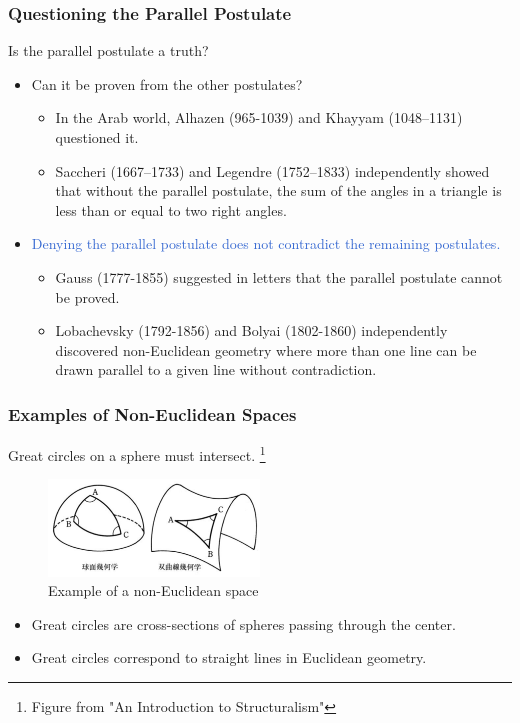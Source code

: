 \documentclass[unicode, 14pt, aspectratio=169]{beamer}
\newcommand\blfootnote[1]{%
  \begingroup
  \renewcommand\thefootnote{}\footnote{#1}%
  \addtocounter{footnote}{-1}%
  \endgroup
}
\begin{document}
\begin{frame}
  \frametitle{Questioning the Parallel Postulate}
  {\large Is the parallel postulate a truth?}
  \begin{itemize}
  \item Can it be proven from the other postulates?
    \begin{itemize}
    \item In the Arab world, Alhazen (965-1039) and Khayyam (1048–1131) questioned it.
    \item Saccheri (1667–1733) and Legendre (1752–1833) independently showed that without the parallel postulate, the sum of the angles in a triangle is less than or equal to two right angles.
    \end{itemize}
  \item \textcolor{highlight}{Denying the parallel postulate does not contradict the remaining postulates.}
    \begin{itemize}
    \item Gauss (1777-1855) suggested in letters that the parallel postulate cannot be proved.
    \item Lobachevsky (1792-1856) and Bolyai (1802-1860) independently discovered non-Euclidean geometry where more than one line can be drawn parallel to a given line without contradiction.
    \end{itemize}
  \end{itemize}
\end{frame}
\begin{frame}
  \frametitle{Examples of Non-Euclidean Spaces}
  {\large Great circles on a sphere must intersect.}
  \blfootnote{Figure from "An Introduction to Structuralism"\supercite{structure}}
  \begin{figure}
    \includegraphics[width=0.5\textwidth]{images/non-euclid.png}
    \caption{Example of a non-Euclidean space}
  \end{figure}
  \begin{itemize}
  \item Great circles are cross-sections of spheres passing through the center.
  \item Great circles correspond to straight lines in Euclidean geometry.
  \end{itemize}
\end{frame}
\end{document}
